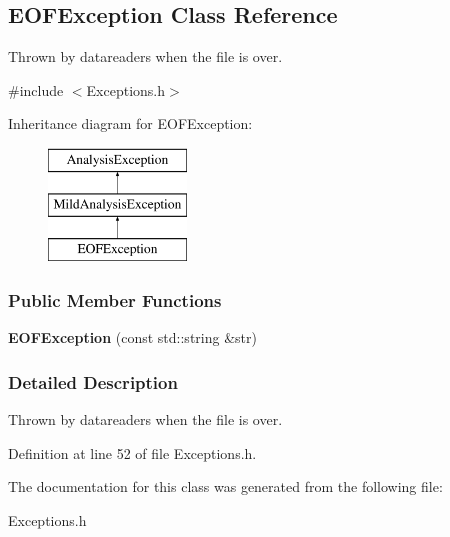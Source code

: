 \hypertarget{classEOFException}{
\subsection{EOFException Class Reference}
\label{classEOFException}
}


Thrown by datareaders when the file is over.  




{\ttfamily \#include $<$Exceptions.h$>$}

Inheritance diagram for EOFException:\begin{figure}[H]
\begin{center}
\leavevmode
\includegraphics[height=3.000000cm]{classEOFException}
\end{center}
\end{figure}
\subsubsection*{Public Member Functions}
\begin{DoxyCompactItemize}
\item 
\hypertarget{classEOFException_aaa118c24a85b6f76e8fdf400e738ace0}{
{\bfseries EOFException} (const std::string \&str)}
\label{classEOFException_aaa118c24a85b6f76e8fdf400e738ace0}

\end{DoxyCompactItemize}


\subsubsection{Detailed Description}
Thrown by datareaders when the file is over. 

Definition at line 52 of file Exceptions.h.



The documentation for this class was generated from the following file:\begin{DoxyCompactItemize}
\item 
Exceptions.h\end{DoxyCompactItemize}
